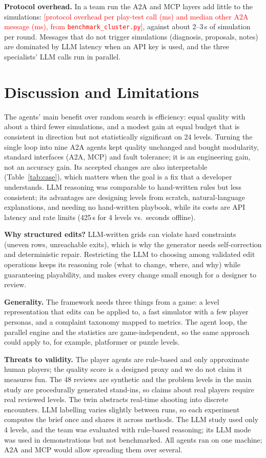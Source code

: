 \documentclass[conference]{IEEEtran}
\newcommand{\fillme}[1]{\textcolor{red}{[#1]}}
\begin{document}
\textbf{Protocol overhead.} In a team run the A2A and MCP layers add little to the simulations:
\fillme{protocol overhead per play-test call (ms) and median other A2A message (ms), from
\texttt{benchmark\_cluster.py}}, against about 2--3\,s of simulation per round. Messages that do not
trigger simulations (diagnosis, proposals, notes) are dominated by LLM latency when an API key is
used, and the three specialists' LLM calls run in parallel.

\section{Discussion and Limitations}
The agents' main benefit over random search is efficiency: equal quality with about a third
fewer simulations, and a modest gain at equal budget that is consistent in direction but not
statistically significant on 24 levels. Turning the single loop into nine A2A agents kept quality
unchanged and bought modularity, standard interfaces (A2A, MCP) and fault tolerance; it is an
engineering gain, not an accuracy gain. Its accepted changes are also
interpretable (Table~\ref{tab:case}), which matters when the goal is a fix that a developer
understands. LLM reasoning was comparable to hand-written rules but less consistent; its
advantages are designing levels from scratch, natural-language explanations, and needing no
hand-written playbook, while its costs are API latency and rate limits (425\,s for 4 levels vs.\
seconds offline).

\textbf{Why structured edits?} LLM-written grids can violate hard constraints (uneven rows,
unreachable exits), which is why the generator needs self-correction and deterministic repair. Restricting the LLM to choosing among validated edit operations keeps its
reasoning role (what to change, where, and why) while guaranteeing playability, and makes every
change small enough for a designer to review.

\textbf{Generality.} The framework needs three things from a game: a level representation that
edits can be applied to, a fast simulator with a few player personas, and a complaint taxonomy
mapped to metrics. The agent loop, the parallel engine and the statistics are game-independent, so
the same approach could apply to, for example, platformer or puzzle levels.

\textbf{Threats to validity.} The player agents are rule-based and only approximate human players;
the quality score is a designed proxy and we do not claim it measures fun. The 48 reviews are
synthetic and the problem levels in the main study are procedurally generated stand-ins, so claims
about real players require real reviewed levels. The twin abstracts real-time shooting into
discrete encounters. LLM labelling varies slightly between runs, so each experiment computes the
brief once and shares it across methods. The LLM study used only 4 levels, and the team was
evaluated with rule-based reasoning; its LLM mode was used in demonstrations but not benchmarked.
All agents ran on one machine; A2A and MCP would allow spreading them over several.
\end{document}
